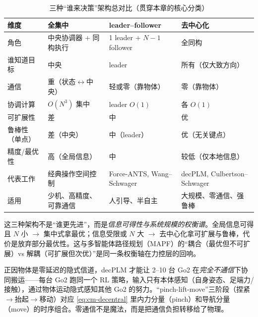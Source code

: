\begin{table}[H]\centering\small
\caption{三种“谁来决策”架构总对比（贯穿本章的核心分类）}
\label{tab:cm-three-arch}
\begin{tabular}{p{2.6cm}p{3.2cm}p{3.2cm}p{3.2cm}}
\toprule
维度 & 全集中 & leader--follower & 去中心化 \\
\midrule
角色 & 中央协调器 $+$ 同构执行 & 1 leader $+$ $N{-}1$ follower & 全同构 \\
谁知道目标 & 中央 & leader & 所有（仅大致方向） \\
通信 & 重（状态$\leftrightarrow$中央） & 轻或零（靠物体） & 零（靠物体） \\
协调计算 & $O(N^3)$ 集中 & leader $O(1)$ & 各 $O(1)$ \\
可扩展性 & 差 & 中 & 优 \\
鲁棒性（单点） & 差（中央） & 中（leader） & 优（无关键点） \\
精度/最优性 & 高（全局信息） & 中 & 较低（仅本地信息） \\
代表工作 & 经典操作空间控制 & Force-ANTS, Wang--Schwager & decPLM, Culbertson--Schwager \\
适用 & 少机、高精度、可靠通信 & 人引导、半自主 & 大规模、零通信、强鲁棒 \\
\bottomrule
\end{tabular}
\end{table}

\begin{insight}
这三种架构不是“谁更先进”，而是\emph{信息可得性与系统规模的权衡谱}。全局信息可得且 $N$ 小 $\to$ 集中式拿最优；信息受限或 $N$ 大 $\to$ 去中心化拿可扩展与鲁棒，代价是放弃部分最优性。这与多智能体路径规划（MAPF）的“耦合（最优但不可扩展）vs 解耦（可扩展但次优）”是同一条权衡轴在力控层的回响。
\end{insight}

\begin{insight}
正因物体是零延迟的隐式信道，decPLM\cite{pandit2025decplm} 才能让 2--10 台 Go2 在\emph{完全不通信}下协同搬运——每台 Go2 跑同一个 RL 策略，输入只有本体感知（自身姿态、足端力/接触），通过物体运动隐式感知其他 Go2 的努力。“pinch-lift-move”三阶段（捏紧$\to$抬起$\to$移动）对应 \cref{eq:cm-decentral} 里内力分量（pinch）和导航分量（move）的时序组合。零通信不是魔法，而是把通信负担转移给了物理。
\end{insight}

